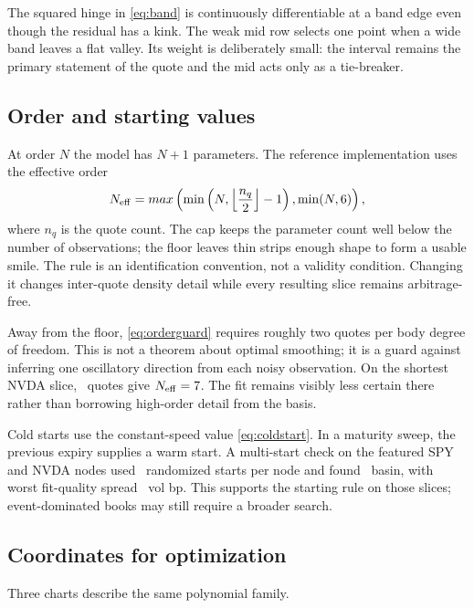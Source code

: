 The squared hinge in \eqref{eq:band} is continuously differentiable at a band
edge even though the residual has a kink.  The weak mid row selects one point
when a wide band leaves a flat valley.  Its weight is deliberately small: the
interval remains the primary statement of the quote and the mid acts only as
a tie-breaker.

\subsection{Order and starting values}
\label{sec:orderguard}

At order $N$ the model has $N+1$ parameters.  The reference implementation
uses the effective order
\begin{equation}
N_{\rm eff}=max\left(
\min\left(N,\left\lfloor\frac{n_q}{2}\right\rfloor-1\right),
\min(N,6)\right),
\label{eq:orderguard}
\end{equation}
where $n_q$ is the quote count.  The cap keeps the parameter count well below
the number of observations; the floor leaves thin strips enough shape to form
a usable smile.  The rule is an identification convention, not a validity
condition.  Changing it changes inter-quote density detail while every
resulting slice remains arbitrage-free.

Away from the floor, \eqref{eq:orderguard} requires roughly two quotes per
body degree of freedom.  This is not a theorem about optimal smoothing; it is
a guard against inferring one oscillatory direction from each noisy
observation.  On the shortest NVDA slice,
\MacGuardQuoteCountZeroDte\ quotes give
$N_{\rm eff}=7$.  The fit remains visibly less certain
there rather than borrowing high-order detail from the basis.

Cold starts use the constant-speed value \eqref{eq:coldstart}.  In a maturity
sweep, the previous expiry supplies a warm start.  A multi-start check on the
featured SPY and NVDA nodes used \MacMultiStartCount\ randomized starts per
node and found \MacMultiStartBasins\ basin, with worst fit-quality spread
\MacMultiStartWorstDIvBp\ vol bp.  This supports the starting rule on those
slices; event-dominated books may still require a broader search.

\subsection{Coordinates for optimization}
\label{sec:charts}

Three charts describe the same polynomial family.

